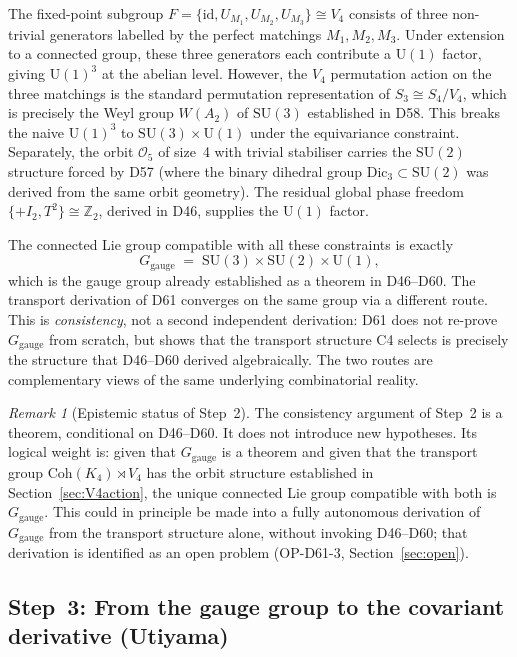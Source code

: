 \documentclass[11pt,a4paper]{article}
\theoremstyle{plain}
\theoremstyle{definition}
\theoremstyle{remark}
\newtheorem{remark}[theorem]{Remark}
\newcommand{\Vfour}{V_4}
\newcommand{\Sfour}{S_4}
\newcommand{\Sthree}{S_3}
\newcommand{\Uone}{\mathrm{U}(1)}
\newcommand{\SUtwo}{\mathrm{SU}(2)}
\newcommand{\SUthree}{\mathrm{SU}(3)}
\newcommand{\Ggauge}{G_{\mathrm{gauge}}}
\newcommand{\Coh}{\mathrm{Coh}(K_4)}
\begin{document}
The fixed-point subgroup $F = \{\mathrm{id}, U_{M_1}, U_{M_2}, U_{M_3}\} \cong \Vfour$
consists of three non-trivial generators labelled by the perfect matchings $M_1, M_2, M_3$.
Under extension to a connected group, these three generators each contribute a
$\Uone$ factor, giving $\Uone^3$ at the abelian level. However, the $\Vfour$
permutation action on the three matchings is the standard permutation representation
of $\Sthree \cong \Sfour/\Vfour$, which is precisely the Weyl group $W(A_2)$ of
$\SUthree$ established in D58. This breaks the naive $\Uone^3$ to $\SUthree \times \Uone$
under the equivariance constraint. Separately, the orbit $\mathcal{O}_5$ of size~4
with trivial stabiliser carries the $\SUtwo$ structure forced by D57 (where the
binary dihedral group $\mathrm{Dic}_3 \subset \SUtwo$ was derived from the same orbit
geometry). The residual global phase freedom $\{+I_2, T^2\} \cong \mathbb{Z}_2$,
derived in D46, supplies the $\Uone$ factor.

The connected Lie group compatible with all these constraints is exactly
\begin{equation}
\Ggauge \;=\; \SUthree \times \SUtwo \times \Uone,
\label{eq:completion}
\end{equation}
which is the gauge group already established as a theorem in D46--D60. The transport
derivation of D61 converges on the same group via a different route. This is
\emph{consistency}, not a second independent derivation: D61 does not re-prove
$\Ggauge$ from scratch, but shows that the transport structure C4 selects is
precisely the structure that D46--D60 derived algebraically. The two routes are
complementary views of the same underlying combinatorial reality.

\begin{remark}[Epistemic status of Step~2]
The consistency argument of Step~2 is a theorem, conditional on D46--D60. It does
not introduce new hypotheses. Its logical weight is: given that $\Ggauge$ is a
theorem and given that the transport group $\Coh \rtimes \Vfour$ has the orbit
structure established in Section~\ref{sec:V4action}, the unique connected Lie group
compatible with both is $\Ggauge$. This could in principle be made into a fully
autonomous derivation of $\Ggauge$ from the transport structure alone, without
invoking D46--D60; that derivation is identified as an open problem
(OP-D61-3, Section~\ref{sec:open}).
\end{remark}

\subsection{Step~3: From the gauge group to the covariant derivative (Utiyama)}
\end{document}
